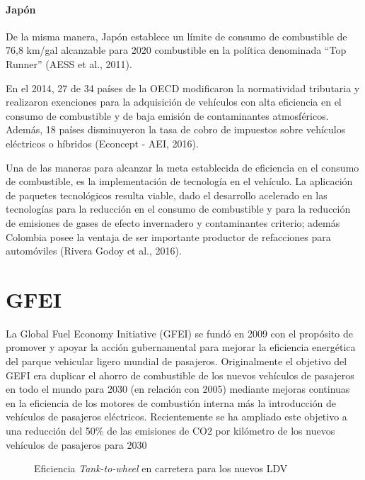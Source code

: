 \paragraph{Japón}
De la misma manera, Japón establece un límite de consumo de combustible de 76,8 km/gal alcanzable para 2020 combustible en la política denominada “Top Runner” (AESS et al., 2011). \\ \label{Informe Final}

En el 2014, 27 de 34 países de la OECD modificaron la normatividad tributaria y realizaron exenciones para la adquisición de vehículos con alta eficiencia en el consumo de combustible y de baja emisión de contaminantes atmosféricos. Además, 18 países disminuyeron la tasa de cobro de impuestos sobre vehículos eléctricos o híbridos (Econcept - AEI, 2016). \label{Informe Final}

Una de las maneras para alcanzar la meta establecida de eficiencia en el consumo de combustible, es la implementación de tecnología en el vehículo. La aplicación de paquetes tecnológicos resulta viable, dado el desarrollo acelerado en las tecnologías para la reducción en el consumo de combustible y para la reducción de emisiones de gases de efecto invernadero y contaminantes criterio; además Colombia posee la ventaja de ser importante productor de refacciones para automóviles (Rivera Godoy et al., 2016). 

\section{GFEI}

La Global Fuel Economy Initiative (GFEI) se fundó en 2009 con el propósito de promover y apoyar la acción gubernamental para mejorar la eficiencia energética del parque vehicular ligero mundial de pasajeros. Originalmente el objetivo del GEFI era duplicar el ahorro de combustible de los nuevos vehículos de pasajeros en todo el mundo para 2030 (en relación con 2005) mediante mejoras continuas en la eficiencia de los motores de combustión interna más la introducción de vehículos de pasajeros eléctricos. Recientemente se ha ampliado este objetivo a una reducción del 50\% de las emisiones de CO2 por kilómetro de los nuevos vehículos de pasajeros para 2030 \cite{Prospects_GFEI}

 \begin{figure}[htbp]
   \centering
   
    \caption{Eficiencia \textit{Tank-to-wheel} en carretera para los nuevos LDV \cite{Prospects_GFEI}}
    \label{fig:prospects-GFEI}
\end{figure}

